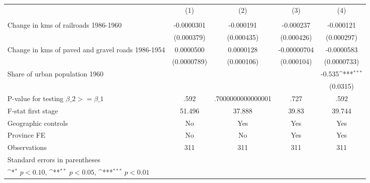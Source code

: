 {
\def\sym#1{\ifmmode^{#1}\else\(^{#1}\)\fi}
\begin{tabular}{l*{4}{c}}
\hline\hline
                &\multicolumn{1}{c}{(1)}&\multicolumn{1}{c}{(2)}&\multicolumn{1}{c}{(3)}&\multicolumn{1}{c}{(4)}\\
                &\multicolumn{1}{c}{}&\multicolumn{1}{c}{}&\multicolumn{1}{c}{}&\multicolumn{1}{c}{}\\
\hline
Change in kms of railroads 1986-1960&-0.0000301         &-0.000191         &-0.000237         &-0.000121         \\
                &(0.000379)         &(0.000435)         &(0.000426)         &(0.000297)         \\
[1em]
Change in kms of paved and gravel roads 1986-1954&0.0000500         &0.0000128         &-0.00000704         &-0.0000583         \\
                &(0.0000789)         &(0.000106)         &(0.000104)         &(0.0000733)         \\
[1em]
Share of urban population 1960&                  &                  &                  &   -0.535\sym{***}\\
                &                  &                  &                  & (0.0315)         \\
\hline
P-value for testing $\beta\_{2} >= \beta\_{1}$&     .592         &.7000000000000001         &     .727         &     .592         \\
F-stat first stage&   51.496         &   37.888         &    39.83         &   39.744         \\
Geographic controls&       No         &      Yes         &      Yes         &      Yes         \\
Province FE     &       No         &       No         &      Yes         &      Yes         \\
Observations    &      311         &      311         &      311         &      311         \\
\hline\hline
\multicolumn{5}{l}{\footnotesize Standard errors in parentheses}\\
\multicolumn{5}{l}{\footnotesize \sym{*} \(p<0.10\), \sym{**} \(p<0.05\), \sym{***} \(p<0.01\)}\\
\end{tabular}
}
